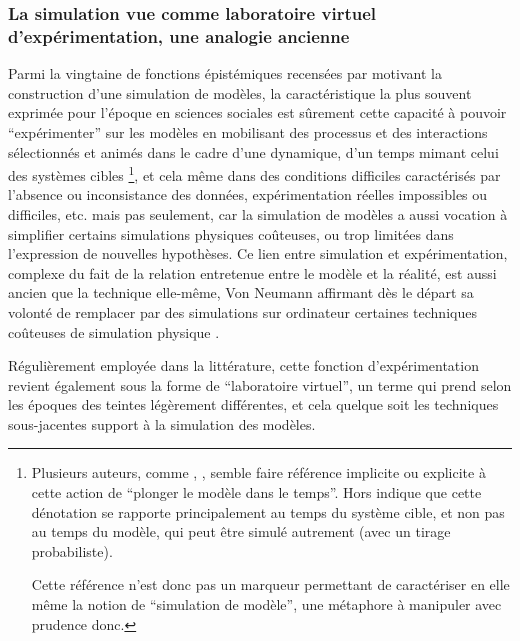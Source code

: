 \subsubsection{La simulation vue comme laboratoire virtuel d'expérimentation, une analogie ancienne}

Parmi la vingtaine de fonctions épistémiques recensées par \textcite[14-23]{Varenne2013} motivant la construction d'une simulation de modèles, la caractéristique la plus souvent exprimée pour l'époque en sciences sociales est sûrement cette capacité à pouvoir \enquote{expérimenter} sur les modèles en mobilisant des processus et des interactions sélectionnés et animés dans le cadre d'une dynamique, d'un temps mimant celui des systèmes cibles \footnote{Plusieurs auteurs, comme \autocite[462]{Gullahorn1965}, \autocite[296]{Doran1970}, \autocite[294-295]{Batty1976} semble faire référence implicite ou explicite à cette action de \enquote{plonger le modèle dans le temps}. Hors \autocite[31]{Varenne2013} indique que cette dénotation se rapporte principalement au temps du système cible, et non pas au temps du modèle, qui peut être simulé autrement (avec un tirage probabiliste).

Cette référence n'est donc pas un marqueur permettant de caractériser en elle même la notion de \enquote{simulation de modèle}, une métaphore à manipuler avec prudence donc.}, et cela même dans des conditions difficiles caractérisés par l'absence ou inconsistance des données, expérimentation réelles impossibles ou difficiles, etc. mais pas seulement, car la simulation de modèles a aussi vocation à simplifier certains simulations physiques coûteuses, ou trop limitées dans l'expression de nouvelles hypothèses. Ce lien entre simulation et expérimentation, complexe du fait de la relation entretenue entre le modèle et la réalité, est aussi ancien que la technique elle-même, Von Neumann affirmant dès le départ sa volonté de remplacer par des simulations sur ordinateur certaines techniques coûteuses de simulation physique \autocite[15]{Winsberg2013}.

Régulièrement employée dans la littérature, cette fonction d’expérimentation revient également sous la forme de \enquote{laboratoire virtuel}, un terme qui prend selon les époques des teintes légèrement différentes, et cela quelque soit les techniques sous-jacentes support à la simulation des modèles.

